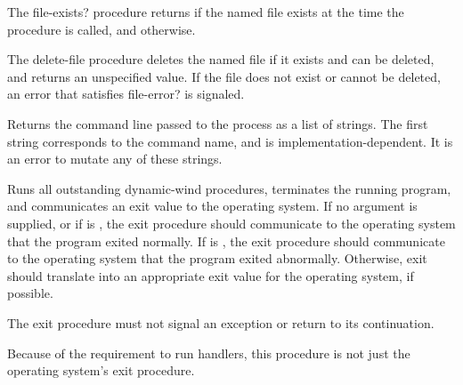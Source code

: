 \begin{entry}{%
}

The {\cf file-exists?} procedure returns
\schtrue{} if the named file exists at the time the procedure is called,
and \schfalse{} otherwise.

\end{entry}

\begin{entry}{%
}

The {\cf delete-file} procedure deletes the
named file if it exists and can be deleted, and returns an unspecified
value.  If the file does not exist or cannot be deleted, an error
that satisfies {\cf file-error?} is signaled.

\end{entry}

\begin{entry}{%
}

Returns the command line passed to the process as a list of
strings.  The first string corresponds to the command name, and is
implementation-dependent.  It is an error to mutate any of these strings.
\end{entry}

\begin{entry}{%
}

Runs all outstanding dynamic-wind  procedures, terminates the
running program, and communicates an exit value to the operating system.
If no argument is supplied, or if  is \schtrue{}, the {\cf
exit} procedure should communicate to the operating system that the
program exited normally.  If  is \schfalse{}, the {\cf exit}
procedure should communicate to the operating system that the program
exited abnormally.  Otherwise, {\cf exit} should translate  into
an appropriate exit value for the operating system, if possible.

The {\cf exit} procedure
must not signal an exception or return to its continuation.

\begin{note}
Because of the requirement to run handlers, this procedure is not just the
operating system's exit procedure.
\end{note}

\end{entry}

